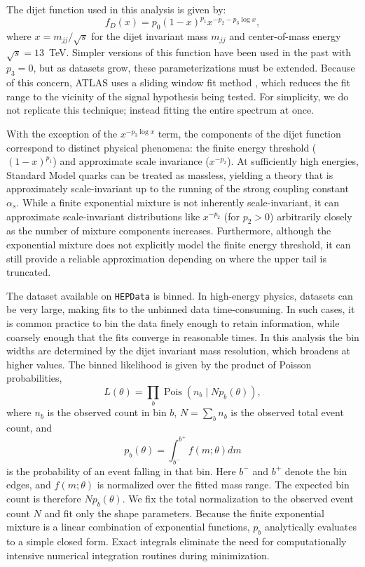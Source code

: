 \documentclass[a4paper,11pt]{article}
\begin{document}
The dijet function used in this analysis is given by:
\begin{equation}
f_D(x) = p_0(1-x)^{p_1}x^{-p_2-p_3\log x},
\end{equation}
where $x=m_{jj}/\sqrt{s}$ for the dijet invariant mass $m_{jj}$ and center-of-mass energy 
$\sqrt{s}=13$~TeV.
Simpler versions of this function have been used in the past with $p_3=0$, but as datasets grow, these parameterizations must be extended. Because of this concern, ATLAS uses a sliding window fit method \cite{ATLAT_Dijet_sliding_window}, which reduces the fit range to the vicinity of the signal hypothesis being tested. For simplicity, we do not replicate this technique; instead fitting the entire spectrum at once.

With the exception of the $x^{-p_3\log x}$ term, the components of the dijet function correspond to distinct physical phenomena: the finite energy threshold ($(1-x)^{p_1}$) and approximate scale invariance ($x^{-p_2}$). At sufficiently high energies, Standard Model quarks can be treated as massless, yielding a theory that is approximately scale-invariant up to the running of the strong coupling constant $\alpha_s$. While a finite exponential mixture is not inherently scale-invariant, it can approximate scale-invariant distributions like $x^{-p_2}$ (for $p_2>0$) arbitrarily closely as the number of mixture components increases. Furthermore, although the exponential mixture does not explicitly model the finite energy threshold, it can still provide a reliable approximation depending on where the upper tail is truncated.

The dataset available on \texttt{HEPData} is binned. In high-energy physics, datasets can be very large, making fits to the unbinned data time-consuming. In such cases, it is common practice to bin the data finely enough to retain information, while coarsely enough that the fits converge in reasonable times. In this analysis the bin widths are determined by the dijet invariant mass resolution, which broadens at higher 
values. The binned likelihood is given by the product of Poisson probabilities,
\begin{equation}
L(\theta)=\prod_b \operatorname{Pois}\left(n_b\mid Np_b(\theta)\right),
\end{equation}
where $n_b$ is the observed count in bin $b$, $N=\sum_b n_b$ is the observed total event count, and
\begin{equation}
p_b(\theta)=\int_{b^-}^{b^+}f(m;\theta)dm
\end{equation}
is the probability of an event falling in that bin. Here $b^-$ and $b^+$ denote the bin edges, and $f(m;\theta)$ is normalized over the fitted mass range. The expected bin count is therefore $Np_b(\theta)$. We fix the total normalization to the observed event count $N$ and fit only the shape parameters. Because the finite exponential mixture is a linear combination of exponential functions, $p_b$ analytically evaluates to a simple closed form. Exact integrals eliminate the need for computationally intensive numerical integration routines during minimization.
\end{document}
